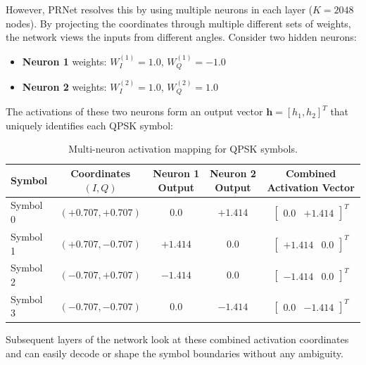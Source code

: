 However, PRNet resolves this by using multiple neurons in each layer ($K = 2048$ nodes). By projecting the coordinates through multiple different sets of weights, the network views the inputs from different angles. Consider two hidden neurons:
\begin{itemize}
    \item \textbf{Neuron 1} weights: $W_I^{(1)} = 1.0$, $W_Q^{(1)} = -1.0$
    \item \textbf{Neuron 2} weights: $W_I^{(2)} = 1.0$, $W_Q^{(2)} = 1.0$
\end{itemize}

The activations of these two neurons form an output vector $\bm{h} = [h_1, h_2]^T$ that uniquely identifies each QPSK symbol:
\begin{table}[H]
    \centering
    \caption{Multi-neuron activation mapping for QPSK symbols.}
    \begin{tabular}{lcccc}
        \toprule
        Symbol & Coordinates $(I, Q)$ & Neuron 1 Output & Neuron 2 Output & Combined Activation Vector \\
        \midrule
        Symbol 0 & $(+0.707, +0.707)$ & $0.0$ & $+1.414$ & $\begin{bmatrix} 0.0 & +1.414 \end{bmatrix}^T$ \\
        Symbol 1 & $(+0.707, -0.707)$ & $+1.414$ & $0.0$ & $\begin{bmatrix} +1.414 & 0.0 \end{bmatrix}^T$ \\
        Symbol 2 & $(-0.707, +0.707)$ & $-1.414$ & $0.0$ & $\begin{bmatrix} -1.414 & 0.0 \end{bmatrix}^T$ \\
        Symbol 3 & $(-0.707, -0.707)$ & $0.0$ & $-1.414$ & $\begin{bmatrix} 0.0 & -1.414 \end{bmatrix}^T$ \\
        \bottomrule
    \end{tabular}
    \label{tab:multi_neuron_mapping}
\end{table}
Subsequent layers of the network look at these combined activation coordinates and can easily decode or shape the symbol boundaries without any ambiguity.

